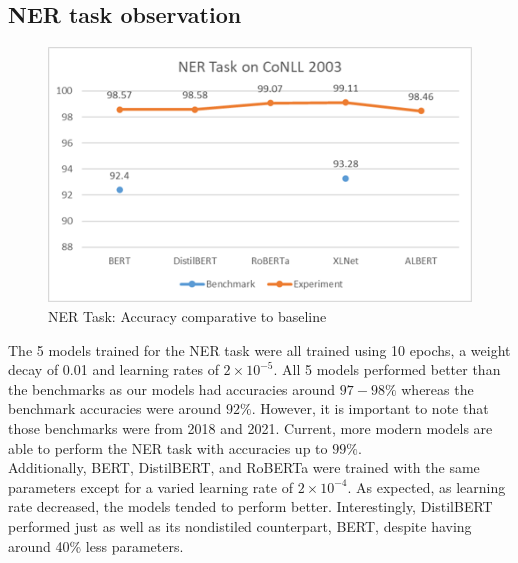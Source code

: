 \documentclass{article}
\begin{document}
\subsection{NER task observation}
\begin{figure}[h]
\centering
\includegraphics[width=0.8\columnwidth]{Picture4.png}
\caption{{NER Task: Accuracy comparative to baseline}}
\label{fig:lossimages}
\vspace{-1pt}
\end{figure}
The 5 models trained for the NER task were all trained using 10 epochs, a weight decay of 0.01 and learning rates of $2 \times 10^{-5}$. All 5 models performed better than the benchmarks as our models had accuracies around $97-98 \%$ whereas the benchmark accuracies were around $92\%$. However, it is important to note that those benchmarks were from 2018 and 2021. Current, more modern models are able to perform the NER task with accuracies up to $99\%$. \\
Additionally, BERT, DistilBERT, and RoBERTa were trained with the same parameters except for a varied learning rate of $2 \times 10^{-4}$. As expected, as learning rate decreased, the models tended to perform better. Interestingly, DistilBERT performed just as well as its nondistiled counterpart, BERT, despite having around 40\% less parameters.
\end{document}
